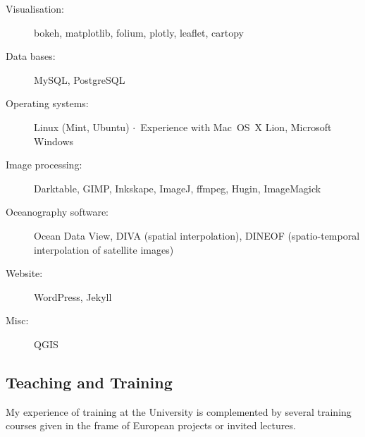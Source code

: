 \documentclass[10pt,a4paper,svgnames]{article}
\newcommand{\sepa}{$\cdot$~}
\begin{document}
\begin{description}
\item[Visualisation:] bokeh, matplotlib, folium, plotly, leaflet, cartopy
\item[Data bases:] MySQL, PostgreSQL
\item[Operating systems:] Linux (Mint, Ubuntu) \sepa Experience with Mac~OS~X Lion, Microsoft Windows
\item[Image processing:] Darktable, GIMP, Inkskape, ImageJ, ffmpeg, Hugin, ImageMagick
\item[Oceanography software:] Ocean Data View, DIVA (spatial interpolation), DINEOF (spatio-temporal interpolation of satellite images)
\item[Website:] WordPress, Jekyll
\item[Misc:] QGIS 
\end{description}


\subsection{Teaching and Training}

\begin{summarybox}
My experience of training at the University is complemented by several training courses given in the frame of European projects or invited lectures.
\end{summarybox}
\end{document}
